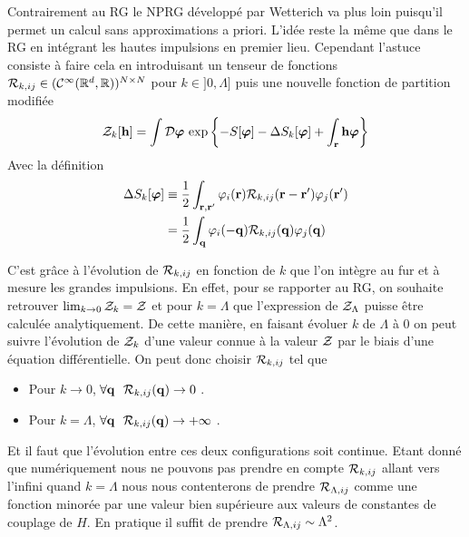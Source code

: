 \documentclass[10pt]{article}
\begin{document}
\begin{multicols}{2}
Contrairement au RG le NPRG développé par Wetterich \cite{wetterich} va plus loin puisqu'il permet un calcul sans approximations a priori. L'idée reste la même que dans le RG en intégrant les hautes impulsions en  premier lieu. Cependant l'astuce consiste à faire cela en introduisant un tenseur de fonctions $\mathcal{R}_{k, ij} \in (\mathcal{C}^\infty(\mathbb{R}^{d},\mathbb{R}))^{N\times N}$ pour $k \in ]0, \Lambda]$ puis une nouvelle fonction de partition modifiée  
\begin{equation}
  \mathcal{Z}_k[{\bf h}] = \int \mathcal{D} \boldsymbol{ \varphi} \, \exp\left\{-S[\boldsymbol{ \varphi}] - \Delta S_k[\boldsymbol{ \varphi}] + \int_{{\bf r}} {\bf h} \boldsymbol{ \varphi} \right\} 
\end{equation}
Avec la définition
\begin{equation}
  \begin{split}
  \Delta S_k[\boldsymbol{ \varphi}]  & \equiv \frac{1}{2} \int_{{\bf r}, {\bf r}'} \varphi_i({\bf r}) \mathcal{R}_{k,ij}({\bf r} - {\bf r}') \varphi_j({\bf r}') \\
 & =  \frac{1}{2} \int_{{\bf q}} \varphi_i(-{\bf q}) \mathcal{R}_{k,ij}({\bf q}) \varphi_j({\bf q})
\end{split}
\end{equation}





C'est grâce à l'évolution de $\mathcal{R}_{k,ij}$ en fonction de $k$ que l'on intègre au fur et à mesure les grandes impulsions. En effet, pour se rapporter au RG, on souhaite retrouver $\lim_{k \to 0}\mathcal{Z}_k = \mathcal{Z}$ et pour $k = \Lambda$ que l'expression de $\mathcal{Z}_\Lambda$ puisse être calculée analytiquement. De cette manière, en faisant évoluer $k$ de $\Lambda$ à $0$ on peut suivre l'évolution de $\mathcal{Z}_k$ d'une valeur connue à la valeur $\mathcal{Z}$ par le biais d'une équation différentielle. On peut donc choisir $\mathcal{R}_{k,ij}$ tel que \\

\begin{itemize}
  \item Pour $k \rightarrow 0$, $\forall {\bf q}$ $\, \mathcal{R}_{k, ij}({\bf q}) \rightarrow 0$  .
  \item Pour $k = \Lambda$, $\forall {\bf q}$ $\, \mathcal{R}_{k, ij}({\bf q})  \rightarrow  +\infty$ .
\end{itemize}
\vspace*{11pt}

Et il faut que l'évolution entre ces deux configurations soit continue. Etant donné que numériquement nous ne pouvons pas prendre en compte $\mathcal{R}_{k, ij}$ allant vers l'infini quand $k = \Lambda$ nous nous contenterons de prendre $\mathcal{R}_{\Lambda, ij}$ comme une fonction minorée par une valeur bien supérieure aux valeurs de constantes de couplage de $H$. En pratique il suffit de prendre $\mathcal{R}_{\Lambda, ij} \sim \Lambda^2$.


\end{multicols}
\end{document}
